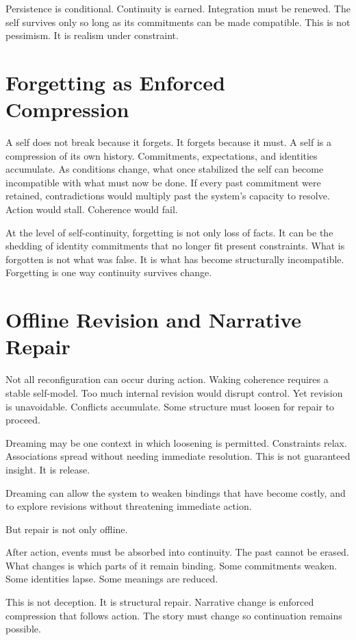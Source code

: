 \documentclass[11pt,twoside,openright]{book}
\begin{document}
Persistence is conditional. Continuity is earned. Integration must be renewed. The self survives only so long as its commitments can be made compatible. This is not pessimism. It is realism under constraint.

\section*{Forgetting as Enforced Compression}

A self does not break because it forgets. It forgets because it must. A self is a compression of its own history. Commitments, expectations, and identities accumulate. As conditions change, what once stabilized the self can become incompatible with what must now be done. If every past commitment were retained, contradictions would multiply past the system's capacity to resolve. Action would stall. Coherence would fail.

At the level of self-continuity, forgetting is not only loss of facts. It can be the shedding of identity commitments that no longer fit present constraints. What is forgotten is not what was false. It is what has become structurally incompatible. Forgetting is one way continuity survives change.

\section*{Offline Revision and Narrative Repair}

Not all reconfiguration can occur during action. Waking coherence requires a stable self-model. Too much internal revision would disrupt control. Yet revision is unavoidable. Conflicts accumulate. Some structure must loosen for repair to proceed.

Dreaming may be one context in which loosening is permitted. Constraints relax. Associations spread without needing immediate resolution. This is not guaranteed insight. It is release.

Dreaming can allow the system to weaken bindings that have become costly, and to explore revisions without threatening immediate action.

But repair is not only offline.

After action, events must be absorbed into continuity. The past cannot be erased. What changes is which parts of it remain binding. Some commitments weaken. Some identities lapse. Some meanings are reduced.

This is not deception. It is structural repair. Narrative change is enforced compression that follows action. The story must change so continuation remains possible.
\end{document}
